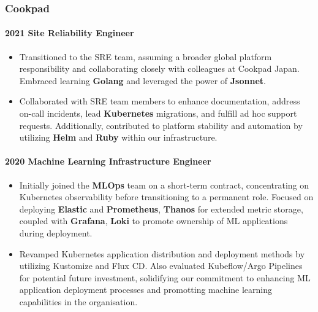 \documentclass[
]{article}
\begin{document}
\hypertarget{material-office-building-cookpad}{%
\subsubsection{\texorpdfstring{\faBuilding
Cookpad}{ Cookpad}}\label{material-office-building-cookpad}}

\hypertarget{site-reliability-engineer}{%
\paragraph{2021 Site Reliability
Engineer}\label{site-reliability-engineer}}

\begin{itemize}
\item
  Transitioned to the SRE team, assuming a broader global platform
  responsibility and collaborating closely with colleagues at Cookpad
  Japan. Embraced learning \textbf{Golang} and leveraged the power of
  \textbf{Jsonnet}.
\item
  Collaborated with SRE team members to enhance documentation, address
  on-call incidents, lead \textbf{Kubernetes} migrations, and fulfill ad
  hoc support requests. Additionally, contributed to platform stability
  and automation by utilizing \textbf{Helm} and \textbf{Ruby} within our
  infrastructure.
\end{itemize}

\hypertarget{machine-learning-infrastructure-engineer}{%
\paragraph{2020 Machine Learning Infrastructure
Engineer}\label{machine-learning-infrastructure-engineer}}

\begin{itemize}
\item
  Initially joined the \textbf{MLOps} team on a short-term contract,
  concentrating on Kubernetes observability before transitioning to a
  permanent role. Focused on deploying \textbf{Elastic} and
  \textbf{Prometheus}, \textbf{Thanos} for extended metric storage,
  coupled with \textbf{Grafana}, \textbf{Loki} to promote ownership of
  ML applications during deployment.
\item
  Revamped Kubernetes application distribution and deployment methods by
  utilizing Kustomize and Flux CD. Also evaluated Kubeflow/Argo
  Pipelines for potential future investment, solidifying our commitment
  to enhancing ML application deployment processes and promotting
  machine learning capabilities in the organisation.
\end{itemize}
\end{document}
